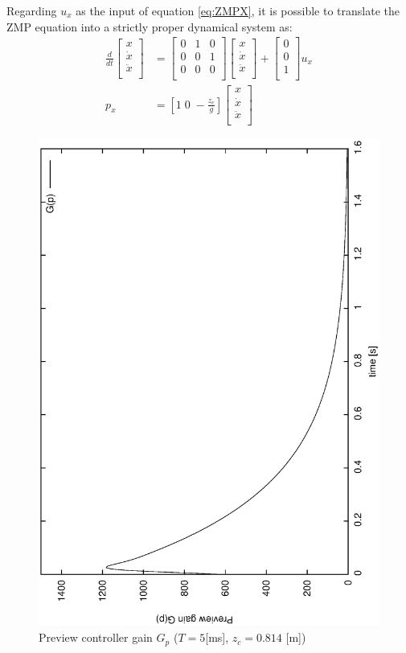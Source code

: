 Regarding $u_x$ as the input of equation \ref{eq:ZMPX}, it is possible to translate the ZMP
equation into a strictly proper dynamical system as:
\begin{equation}
\begin{aligned}
\frac{d}{dt}
\left[
\begin{matrix}
x \\
\dot{x} \\
\ddot{x} \\
\end{matrix}
\right] &=
\left[
\begin{matrix}
0 & 1 & 0 \\
0 & 0 & 1 \\
0 & 0 & 0 \\
\end{matrix}
\right]
\left[
\begin{matrix}
x \\
\dot{x} \\
\ddot{x} \\
\end{matrix}
\right]
+
\left[
\begin{matrix}
0 \\
0 \\
1 \\
\end{matrix}
\right]
u_x \\
p_x &= [ 1 \; 0 \; -\frac{z_c}{g} ]
\left[
\begin{matrix}
x \\
\dot{x} \\
\ddot{x} \\
\end{matrix}
\right]
\end{aligned}
\label{eq:DynamicalSystem}
\end{equation}
%
\begin{figure}[htb]
\begin{center}
\includegraphics[width=0.5\linewidth]{./figures/PatternGenerator/PreviewGains}
\caption{Preview controller gain $G_p$ ($T = 5$[ms], $z_c=0.814$ [m])}
\label{pic:PreviewGains}
\end{center}
\end{figure}
